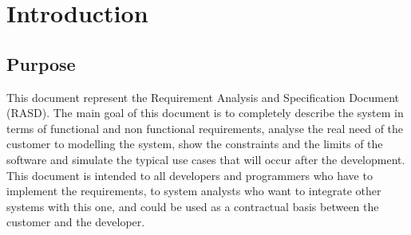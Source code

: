 \chapter{Introduction}

\section{Purpose}
This document represent the Requirement Analysis and Specification Document (RASD). The main goal of this document is to completely describe the system in terms of functional and non functional requirements, analyse the real need of the customer to modelling the system, show the constraints and the limits of the software and simulate the typical use cases that will occur after the development. This document is intended to all developers and programmers who have to implement the requirements, to system analysts who want to integrate other systems with this one, and could be used as a contractual basis between the customer and the developer.

